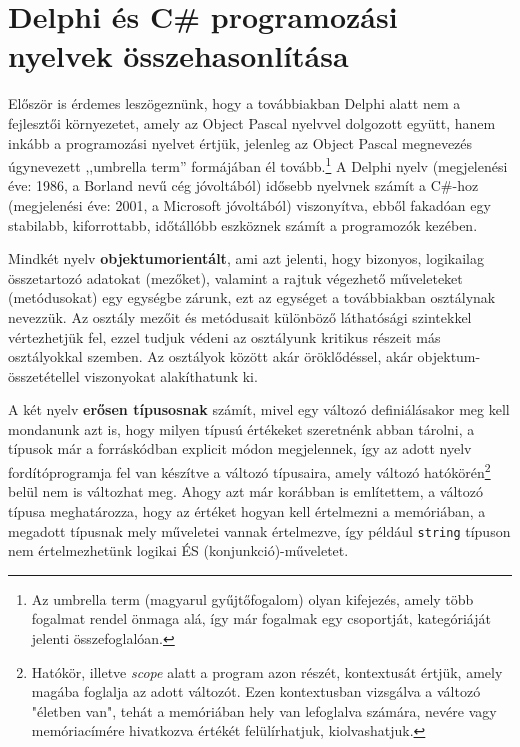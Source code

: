 \documentclass[tocnopagenum]{thesis-ekf}
\theoremstyle{definition}
\theoremstyle{remark}
\begin{document}
	\section{Delphi és C\# programozási nyelvek összehasonlítása}
	Először is érdemes leszögeznünk, hogy a továbbiakban Delphi alatt nem a fejlesztői környezetet, amely az Object Pascal nyelvvel dolgozott együtt, hanem inkább a programozási nyelvet értjük, jelenleg az Object Pascal megnevezés úgynevezett ,,umbrella term'' formájában él tovább.\footnote{Az umbrella term (magyarul gyűjtőfogalom) olyan kifejezés, amely több fogalmat rendel önmaga alá, így már fogalmak egy csoportját, kategóriáját jelenti összefoglalóan.} \cite{sof_delphi}
	A Delphi nyelv (megjelenési éve: 1986, a Borland nevű cég jóvoltából) idősebb nyelvnek számít a C\#-hoz (megjelenési éve: 2001, a Microsoft 
	jóvoltából) viszonyítva, ebből fakadóan egy stabilabb, kiforrottabb, időtállóbb eszköznek számít a programozók kezében. 
	
	Mindkét nyelv \textbf{objektumorientált}, ami azt jelenti, hogy bizonyos, logikailag összetartozó adatokat (mezőket), valamint a rajtuk végezhető műveleteket (metódusokat) egy egységbe zárunk, ezt az egységet a továbbiakban osztálynak nevezzük. Az osztály mezőit és metódusait különböző láthatósági szintekkel vértezhetjük fel, ezzel tudjuk védeni az osztályunk kritikus részeit más osztályokkal szemben. Az osztályok között akár öröklődéssel, akár objektum-összetétellel viszonyokat alakíthatunk ki.
	
	A két nyelv \textbf{erősen típusosnak} számít, mivel egy változó definiálásakor meg kell mondanunk azt is, hogy milyen típusú értékeket szeretnénk abban tárolni, a típusok már a forráskódban explicit módon megjelennek, így az adott nyelv fordítóprogramja fel van készítve a változó típusaira, amely változó hatókörén\footnote{Hatókör, illetve \textit{scope} alatt a program azon részét, kontextusát értjük, amely magába foglalja az adott változót. Ezen kontextusban vizsgálva a változó "életben van", tehát a memóriában hely van lefoglalva számára, nevére vagy memóriacímére hivatkozva értékét felülírhatjuk, kiolvashatjuk.} belül nem is változhat meg. Ahogy azt már korábban is említettem, a változó típusa meghatározza, hogy az értéket hogyan kell értelmezni a memóriában, a megadott típusnak mely műveletei vannak értelmezve, így például \verb|string| típuson nem értelmezhetünk logikai ÉS (konjunkció)-műveletet.
	
\end{document}
